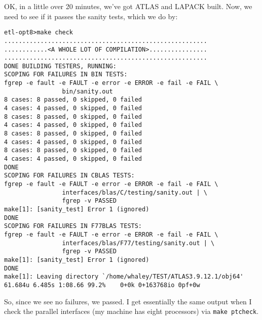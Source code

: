 \documentclass[11pt]{article}
\begin{document}
OK, in a little over 20 minutes, we've got ATLAS and LAPACK built.  Now, we need
to see if it passes the sanity tests, which we do by:
\vspace*{-0.1in}
\begin{footnotesize}
\begin{verbatim}
etl-opt8>make check
........................................................
............<A WHOLE LOT OF COMPILATION>................
........................................................
DONE BUILDING TESTERS, RUNNING:
SCOPING FOR FAILURES IN BIN TESTS:
fgrep -e fault -e FAULT -e error -e ERROR -e fail -e FAIL \
                bin/sanity.out
8 cases: 8 passed, 0 skipped, 0 failed
4 cases: 4 passed, 0 skipped, 0 failed
8 cases: 8 passed, 0 skipped, 0 failed
4 cases: 4 passed, 0 skipped, 0 failed
8 cases: 8 passed, 0 skipped, 0 failed
4 cases: 4 passed, 0 skipped, 0 failed
8 cases: 8 passed, 0 skipped, 0 failed
4 cases: 4 passed, 0 skipped, 0 failed
DONE
SCOPING FOR FAILURES IN CBLAS TESTS:
fgrep -e fault -e FAULT -e error -e ERROR -e fail -e FAIL \
                interfaces/blas/C/testing/sanity.out | \
                fgrep -v PASSED
make[1]: [sanity_test] Error 1 (ignored)
DONE
SCOPING FOR FAILURES IN F77BLAS TESTS:
fgrep -e fault -e FAULT -e error -e ERROR -e fail -e FAIL \
                interfaces/blas/F77/testing/sanity.out | \
                fgrep -v PASSED
make[1]: [sanity_test] Error 1 (ignored)
DONE
make[1]: Leaving directory `/home/whaley/TEST/ATLAS3.9.12.1/obj64'
61.684u 6.485s 1:08.66 99.2%    0+0k 0+163768io 0pf+0w
\end{verbatim}
\end{footnotesize}

So, since we see no failures, we passed.  I get essentially the same
output when I check the parallel interfaces (my machine has eight processors)
via {\tt make ptcheck}.
\end{document}
